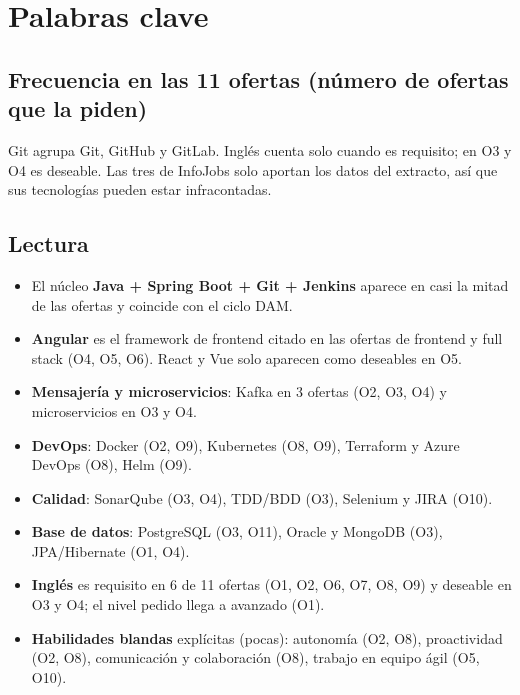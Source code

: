 \section{Palabras clave}
\subsection*{Frecuencia en las 11 ofertas (n\'umero de ofertas que la piden)}
\begin{center}
\end{center}
{\mono\footnotesize\color{inkmuted}Git agrupa Git, GitHub y GitLab. Ingl\'es cuenta solo cuando es requisito; en O3 y O4 es deseable. Las tres de InfoJobs solo aportan los datos del extracto, as\'i que sus tecnolog\'ias pueden estar infracontadas.}

\subsection*{Lectura}
\begin{itemize}
\item El n\'ucleo \textbf{Java + Spring Boot + Git + Jenkins} aparece en casi la mitad de las ofertas y coincide con el ciclo DAM.
\item \textbf{Angular} es el framework de frontend citado en las ofertas de frontend y full stack (O4, O5, O6). React y Vue solo aparecen como deseables en O5.
\item \textbf{Mensajer\'ia y microservicios}: Kafka en 3 ofertas (O2, O3, O4) y microservicios en O3 y O4.
\item \textbf{DevOps}: Docker (O2, O9), Kubernetes (O8, O9), Terraform y Azure DevOps (O8), Helm (O9).
\item \textbf{Calidad}: SonarQube (O3, O4), TDD/BDD (O3), Selenium y JIRA (O10).
\item \textbf{Base de datos}: PostgreSQL (O3, O11), Oracle y MongoDB (O3), JPA/Hibernate (O1, O4).
\item \textbf{Ingl\'es} es requisito en 6 de 11 ofertas (O1, O2, O6, O7, O8, O9) y deseable en O3 y O4; el nivel pedido llega a avanzado (O1).
\item \textbf{Habilidades blandas} expl\'icitas (pocas): autonom\'ia (O2, O8), proactividad (O2, O8), comunicaci\'on y colaboraci\'on (O8), trabajo en equipo \'agil (O5, O10).
\end{itemize}

